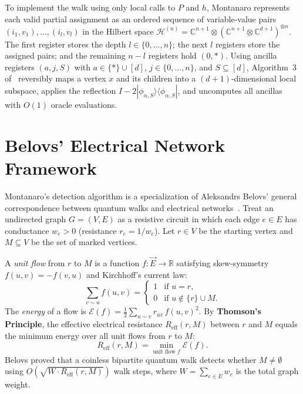 \documentclass[11pt,a4paper]{article}
\begin{document}
To implement the walk using only local calls to $P$ and $h$, Montanaro represents each valid partial assignment as an ordered sequence of variable-value pairs $(i_1, v_1), \dots, (i_l, v_l)$ in the Hilbert space $\mathcal{H}^{(n)} = \mathbb{C}^{n+1} \otimes (\mathbb{C}^{n+1} \otimes \mathbb{C}^{d+1})^{\otimes n}$. The first register stores the depth $l \in \{0, \dots, n\}$; the next $l$ registers store the assigned pairs; and the remaining $n-l$ registers hold $(0, *)$. Using ancilla registers $(a, j, S)$ with $a \in \{*\} \cup [d]$, $j \in \{0, \dots, n\}$, and $S \subseteq [d]$, Algorithm~3 of~\cite{montanaro2015} reversibly maps a vertex $x$ and its children into a $(d+1)$-dimensional local subspace, applies the reflection $I - 2|\phi_{\alpha, S}\rangle\langle\phi_{\alpha, S}|$, and uncomputes all ancillas with $O(1)$ oracle evaluations.

\section{Belovs' Electrical Network Framework}

Montanaro's detection algorithm is a specialization of Aleksandrs Belovs' general correspondence between quantum walks and electrical networks~\cite{belovs2013,belovs2013b}. Treat an undirected graph $G = (V, E)$ as a resistive circuit in which each edge $e \in E$ has conductance $w_e > 0$ (resistance $r_e = 1/w_e$). Let $r \in V$ be the starting vertex and $M \subseteq V$ be the set of marked vertices.

A \emph{unit flow} from $r$ to $M$ is a function $f : \vec{E} \to \mathbb{R}$ satisfying skew-symmetry $f(u, v) = -f(v, u)$ and Kirchhoff's current law:
\[
\sum_{v \sim u} f(u, v) =
\begin{cases}
1 & \text{if } u = r, \\
0 & \text{if } u \notin \{r\} \cup M.
\end{cases}
\]
The \emph{energy} of a flow is $\mathcal{E}(f) = \frac{1}{2}\sum_{u \sim v} r_{uv}\, f(u, v)^2$. By \textbf{Thomson's Principle}, the effective electrical resistance $R_{\mathrm{eff}}(r, M)$ between $r$ and $M$ equals the minimum energy over all unit flows from $r$ to $M$:
\[
R_{\mathrm{eff}}(r, M) = \min_{\text{unit flow } f} \mathcal{E}(f).
\]
Belovs proved that a coinless bipartite quantum walk detects whether $M \neq \emptyset$ using $O(\sqrt{W \cdot R_{\mathrm{eff}}(r, M)})$ walk steps, where $W = \sum_{e \in E} w_e$ is the total graph weight.
\end{document}
